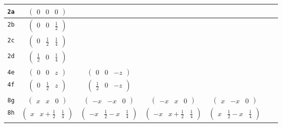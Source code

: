 \documentclass[fleqn,9pt,landscape]{jsarticle}
\begin{document}
\begin{center}
\begin{longtable}{ccccccc}
{\tt 2a} & $ \begin{pmatrix} 0 & 0 & 0 \end{pmatrix} $ & $  $ & $  $ & $  $ & $  $ & $  $ \\ \hline
{\tt 2b} & $ \begin{pmatrix} 0 & 0 & \frac{1}{2} \end{pmatrix} $ & $  $ & $  $ & $  $ & $  $ & $  $ \\ \hline
{\tt 2c} & $ \begin{pmatrix} 0 & \frac{1}{2} & \frac{1}{4} \end{pmatrix} $ & $  $ & $  $ & $  $ & $  $ & $  $ \\ \hline
{\tt 2d} & $ \begin{pmatrix} \frac{1}{2} & 0 & \frac{1}{4} \end{pmatrix} $ & $  $ & $  $ & $  $ & $  $ & $  $ \\ \hline
{\tt 4e} & $ \begin{pmatrix} 0 & 0 & z \end{pmatrix} $ & $ \begin{pmatrix} 0 & 0 & - z \end{pmatrix} $ & $  $ & $  $ & $  $ & $  $ \\ \hline
{\tt 4f} & $ \begin{pmatrix} 0 & \frac{1}{2} & z \end{pmatrix} $ & $ \begin{pmatrix} \frac{1}{2} & 0 & - z \end{pmatrix} $ & $  $ & $  $ & $  $ & $  $ \\ \hline
{\tt 8g} & $ \begin{pmatrix} x & x & 0 \end{pmatrix} $ & $ \begin{pmatrix} - x & - x & 0 \end{pmatrix} $ & $ \begin{pmatrix} - x & x & 0 \end{pmatrix} $ & $ \begin{pmatrix} x & - x & 0 \end{pmatrix} $ & $  $ & $  $ \\ \hline
{\tt 8h} & $ \begin{pmatrix} x & x + \frac{1}{2} & \frac{1}{4} \end{pmatrix} $ & $ \begin{pmatrix} - x & \frac{1}{2} - x & \frac{1}{4} \end{pmatrix} $ & $ \begin{pmatrix} - x & x + \frac{1}{2} & \frac{1}{4} \end{pmatrix} $ & $ \begin{pmatrix} x & \frac{1}{2} - x & \frac{1}{4} \end{pmatrix} $ & $  $ & $  $ \\ \hline

\end{longtable}
\end{center}
\end{document}
